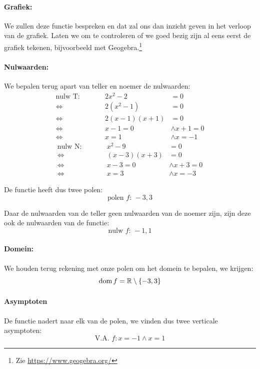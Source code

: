 \documentclass[12pt,twoside,a4paper]{article}
\begin{document}
\paragraph{Grafiek: }
We zullen deze functie bespreken en dat zal ons dan inzicht geven in het verloop van de grafiek. Laten we om te controleren of we goed bezig zijn al eens eerst de grafiek tekenen, bijvoorbeeld met Geogebra.\footnote{Zie \url{https://www.geogebra.org/}}

\paragraph{Nulwaarden: }
We bepalen terug apart van teller en noemer de nulwaarden:
\begin{align*}
  \text{nulw T:}\qquad && 2x^2-2      &= 0\\
  \Leftrightarrow               && 2(x^2 -1)   &= 0\\
  \Leftrightarrow               && 2(x-1)(x+1) &= 0\\
  \Leftrightarrow               && x-1 = 0 &\wedge x+1 = 0\\
  \Leftrightarrow               && x = 1   &\wedge x = -1
\end{align*}
\begin{align*}
  \text{nulw N:}\qquad && x^2-9      &= 0\\
  \Leftrightarrow               && (x-3)(x+3) &= 0\\
  \Leftrightarrow               && x-3 = 0 &\wedge x+3 = 0\\
  \Leftrightarrow               && x = 3   &\wedge x = -3
\end{align*}

De functie heeft dus twee polen:
$$\text{polen $f$: } -3, 3$$

Daar de nulwaarden van de teller geen nulwaarden van de noemer zijn, zijn deze ook de nulwaarden van de functie:
$$\text{nulw $f$: } -1, 1$$

\paragraph{Domein: }
We houden terug rekening met onze polen om het domein te bepalen, we krijgen:
$$\dom f = \mathbb{R} \setminus \{-3, 3\}$$

\paragraph{Asymptoten}
De functie nadert naar elk van de polen, we vinden dus twee verticale asymptoten:
$$\text{V.A. } f: x=-1 \wedge x=1$$
\end{document}
